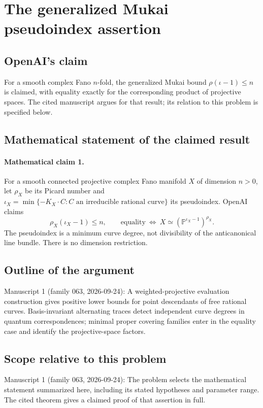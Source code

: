 \documentclass[11pt]{article}
\begin{document}
\section*{The generalized Mukai pseudoindex assertion}

\subsection{OpenAI's claim}
For a smooth complex Fano $n$-fold, the generalized Mukai bound $\rho(\iota-1)\le n$ is claimed, with equality exactly for the corresponding product of projective spaces. The cited manuscript argues for that result; its relation to this problem is specified below.

\subsection{Mathematical statement of the claimed result}
\paragraph{Mathematical claim 1.} For a smooth connected projective complex Fano manifold $X$ of dimension $n>0$, let $\rho_X$ be its Picard number and $\iota_X=\min\{-K_X\cdot C:C\text{ an irreducible rational curve}\}$ its pseudoindex. OpenAI claims
\[
\rho_X(\iota_X-1)\le n,
\qquad\text{equality}\ \Longleftrightarrow\ X\simeq(\mathbb P^{\iota_X-1})^{\rho_X}.
\]
The pseudoindex is a minimum curve degree, not divisibility of the anticanonical line bundle. There is no dimension restriction.

\subsection{Outline of the argument}
Manuscript 1 (family 063, 2026-09-24): A weighted-projective evaluation construction gives positive lower bounds for point descendants of free rational curves. Basis-invariant alternating traces detect independent curve degrees in quantum correspondences; minimal proper covering families enter in the equality case and identify the projective-space factors.

\subsection{Scope relative to this problem}
Manuscript 1 (family 063, 2026-09-24): The problem selects the mathematical statement summarized here, including its stated hypotheses and parameter range. The cited theorem gives a claimed proof of that assertion in full.
\end{document}
